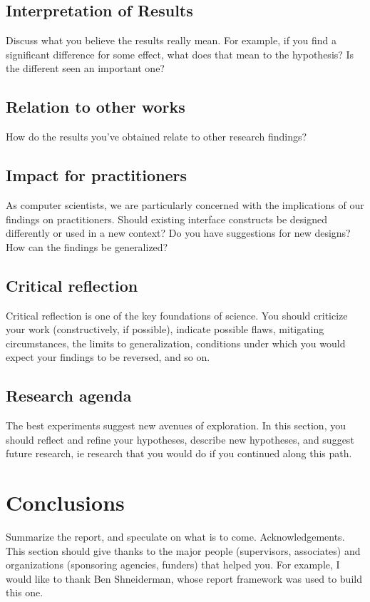 \subsection{Interpretation of Results}
Discuss what you believe the results really mean. For example, if you find a significant difference for some effect, what does that mean to the hypothesis? Is the different seen an important one?
\subsection{Relation to other works}
How do the results you’ve obtained relate to other research findings?
\subsection{Impact for practitioners}
As computer scientists, we are particularly concerned with the implications of our findings on practitioners. Should existing interface constructs be designed differently or used in a new context? Do you have suggestions for new designs? How can the findings be generalized?
\subsection{Critical reflection}
Critical reflection is one of the key foundations of science. You should criticize your work (constructively, if possible), indicate possible flaws, mitigating circumstances, the limits to generalization, conditions under which you would expect your findings to be reversed, and so on.
\subsection{Research agenda}
The best experiments suggest new avenues of exploration. In this section, you should reflect and refine your hypotheses, describe new hypotheses, and suggest future research, ie research that you would do if you continued along this path.
\section{Conclusions}
Summarize the report, and speculate on what is to come.
Acknowledgements. This section should give thanks to the major people (supervisors, associates) and organizations (sponsoring agencies, funders) that helped you. For example, I would like to thank Ben Shneiderman, whose report framework was used to build this one.

